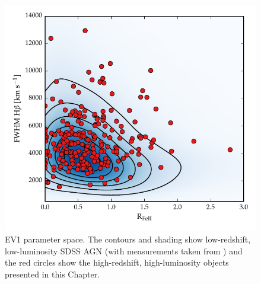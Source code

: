 \begin{figure}[t!]
    \includegraphics[width=\columnwidth]{figures/chapter04/ev1_lowz.pdf} 
    \caption[{EV1 parameter space.}]{EV1 parameter space. The contours and shading show low-redshift, low-luminosity SDSS AGN (with measurements taken from \citealt{shen11}) and the red circles show the high-redshift, high-luminosity objects presented in this Chapter.}      
    \label{fig:ev1_lowz}
\end{figure}

